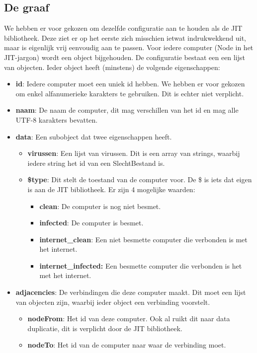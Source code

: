 \documentclass[a4paper,oneside]{report}
\begin{document}
\subsection{De graaf}
We hebben er voor gekozen om dezelfde configuratie aan te houden als de JIT bibliotheek.
Deze ziet er op het eerste zich misschien ietwat indrukwekkend uit, maar is eigenlijk vrij eenvoudig aan te passen.
Voor iedere computer (Node in het JIT-jargon) wordt een object bijgehouden. De configuratie bestaat een een lijst van objecten.
Ieder object heeft (minstens) de volgende eigenschappen:
\begin{itemize}
    \item \textbf{id}: Iedere computer moet een uniek id hebben. We hebben er voor gekozen om enkel alfanumerieke karakters te gebruiken. Dit is echter niet verplicht.
    \item \textbf{naam}: De naam de computer, dit mag verschillen van het id en mag alle UTF-8 karakters bevatten.
    \item \textbf{data}: Een subobject dat twee eigenschappen heeft.
    	\begin{itemize}
	    \item \textbf{virussen}: Een lijst van virussen. Dit is een array van strings, waarbij iedere string het id van een SlechtBestand is.
	    \item \textbf{\$type}: Dit stelt de toestand van de computer voor. De \$ is iets dat eigen is aan de JIT bibliotheek. 
	    		Er zijn 4 mogelijke waarden: 
			\begin{itemize}
			    \item \textbf{clean}: De computer is nog niet besmet.
			    \item \textbf{infected}: De computer is besmet.
			    \item \textbf{internet\_clean}: Een niet besmette computer die verbonden is met het internet.
			    \item \textbf{internet\_infected:} Een besmette computer die verbonden is het met het internet.
			\end{itemize}
	\end{itemize}
    \item \textbf{adjacencies}: De verbindingen die deze computer maakt. Dit moet een lijst van objecten zijn, waarbij ieder object een verbinding voorstelt.
    	\begin{itemize}
	    \item \textbf{nodeFrom}: Het id van deze computer. Ook al ruikt dit naar data duplicatie, dit is verplicht door de JIT bibliotheek.
	    \item \textbf{nodeTo}: Het id van de computer naar waar de verbinding moet.
	\end{itemize}
\end{itemize}
\pagebreak
\end{document}

